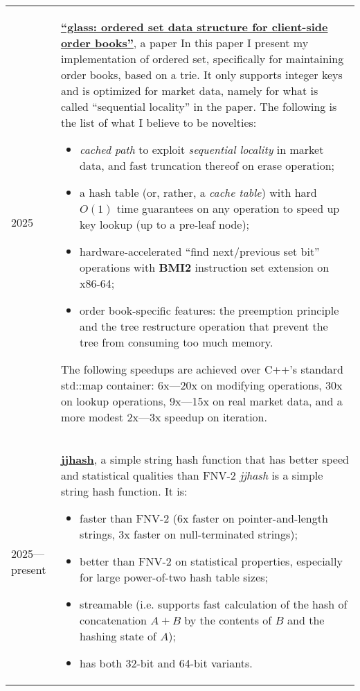 \documentclass[10pt]{article}
\begin{document}
\begin{tabularx}{\textwidth}{ l X }

    2025 & \href{https://github.com/shdown/glass-paper}{\textbf{``glass: ordered set data structure for client-side order books''}}, a paper
    \newline
    In this paper I present my implementation of ordered set, specifically for maintaining order books, based on a trie.
    It only supports integer keys and is optimized for market data, namely for what is called ``sequential locality'' in the paper.
    The following is the list of what I believe to be novelties:
    \begin{itemize}
        \item \textit{cached path} to exploit \textit{sequential locality} in market data, and fast truncation thereof on erase operation;
        \item a hash table (or, rather, a \textit{cache table}) with hard $O(1)$ time guarantees on any operation to speed up key lookup (up to a pre-leaf node);
        \item hardware-accelerated ``find next/previous set bit'' operations with \textbf{BMI2} instruction set extension on x86-64;
        \item order book-specific features: the preemption principle and the tree restructure operation that prevent the tree from consuming too much memory.
    \end{itemize}
    The following speedups are achieved over C++'s standard std::map container: 6x---20x on modifying operations, 30x on lookup operations, 9x---15x on real market data, and a more modest 2x---3x speedup on iteration.
    \\
    \medskip

    2025---present & \href{https://github.com/shdown/jjhash}{\textbf{jjhash}}, a simple string hash function that has better speed and statistical qualities than FNV-2
    \newline
    \textit{jjhash} is a simple string hash function. It is:
    \begin{itemize}
        \item faster than FNV-2 (6x faster on pointer-and-length strings, 3x faster on null-terminated strings);
        \item better than FNV-2 on statistical properties, especially for large power-of-two hash table sizes;
        \item streamable (i.e. supports fast calculation of the hash of concatenation $A+B$ by the contents of $B$ and the hashing state of $A$);
        \item has both 32-bit and 64-bit variants.
    \end{itemize}
    \\

\end{tabularx}
\end{document}
